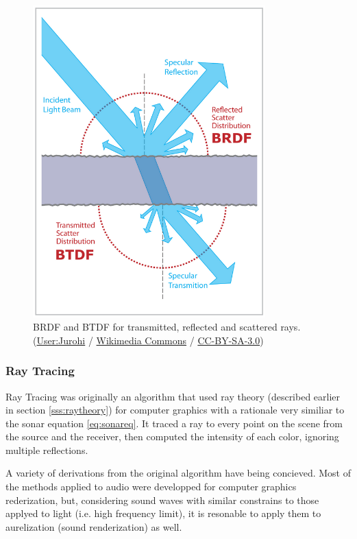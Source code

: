 \begin{figure}
	\centering
	\includegraphics[width=0.8\textwidth]{Chap2/fig/BRDF_BTDF}
	\caption{BRDF and BTDF for transmitted, reflected and scattered rays.
	(\textcopyright  \href{http://commons.wikimedia.org/wiki/User:Jurohi}{User:Jurohi} /
	\href{http://commons.wikimedia.org/}{Wikimedia Commons} /
	\href{http://creativecommons.org/licenses/by-sa/3.0/}{CC-BY-SA-3.0})}
	\label{fig:brdfbtdf}
\end{figure}




\subsubsection{Ray Tracing}

Ray Tracing was originally an algorithm that used ray theory
(described earlier in section \ref{sss:raytheory}) for computer graphics with a
rationale very similiar to the sonar equation \ref{eq:sonareq}. It traced a ray to every point on the scene
from the source and the receiver, then computed the intensity of each color,
ignoring multiple reflections. 

A variety of derivations from the original algorithm have being concieved. Most
of the methods applied to audio were developped for computer graphics
rederization, but, considering sound waves with similar constrains to those
applyed to light (i.e. high frequency limit), it is resonable to apply them to
aurelization (sound renderization) as well.


